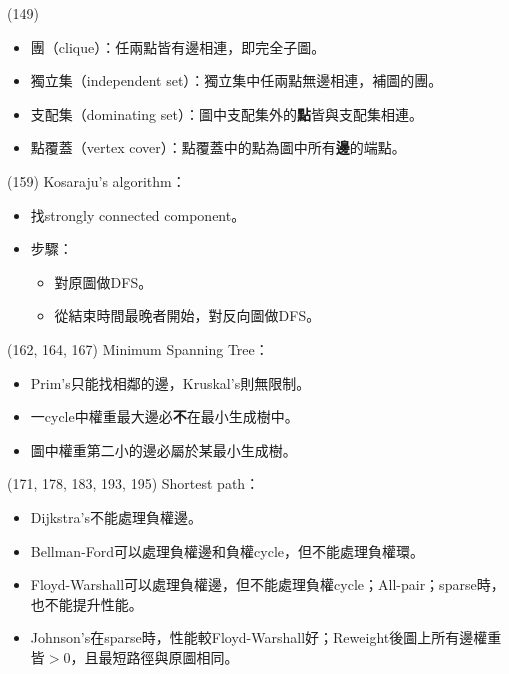 \item \begin{theorem}{(149)} \quad\quad
    \begin{itemize}
        \item 團（clique）：任兩點皆有邊相連，即完全子圖。
        \item 獨立集（independent set）：獨立集中任兩點無邊相連，補圖的團。
        \item 支配集（dominating set）：圖中支配集外的\textbf{點}皆與支配集相連。
        \item 點覆蓋（vertex cover）：點覆蓋中的點為圖中所有\textbf{邊}的端點。
    \end{itemize}
\end{theorem}

\item \begin{theorem}{(159)} Kosaraju's algorithm： \begin{itemize}
        \item 找strongly connected component。
        \item 步驟：\begin{itemize}
            \item 對原圖做DFS。
            \item 從結束時間最晚者開始，對反向圖做DFS。
        \end{itemize}
    \end{itemize}
\end{theorem}

\item \begin{theorem}{(162, 164, 167)} Minimum Spanning Tree： \begin{itemize}
        \item Prim's只能找相鄰的邊，Kruskal's則無限制。
        \item 一cycle中權重最大邊必\textbf{不}在最小生成樹中。
        \item 圖中權重第二小的邊必屬於某最小生成樹。
    \end{itemize}
\end{theorem}

\item \begin{theorem}{(171, 178, 183, 193, 195)} Shortest path： \begin{itemize}
        \item Dijkstra's不能處理負權邊。
        \item Bellman-Ford可以處理負權邊和負權cycle，但不能處理負權環。
        \item Floyd-Warshall可以處理負權邊，但不能處理負權cycle；All-pair；sparse時，也不能提升性能。
        \item Johnson's在sparse時，性能較Floyd-Warshall好；Reweight後圖上所有邊權重皆$>0$，且最短路徑與原圖相同。
    \end{itemize}
\end{theorem}

